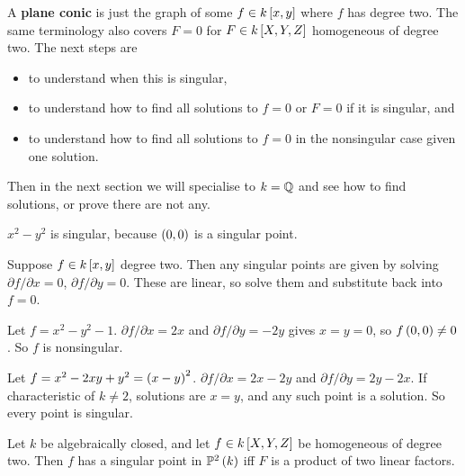 
A \textbf{plane conic} is just the graph of some $ f \in k\sbr{x, y} $ where $ f $ has degree two. The same terminology also covers $ F = 0 $ for $ F \in k\sbr{X, Y, Z} $ homogeneous of degree two. The next steps are
\begin{itemize}
\item to understand when this is singular,
\item to understand how to find all solutions to $ f = 0 $ or $ F = 0 $ if it is singular, and
\item to understand how to find all solutions to $ f = 0 $ in the nonsingular case given one solution.
\end{itemize}
Then in the next section we will specialise to $ k = \mathbb{Q} $ and see how to find solutions, or prove there are not any.

\begin{example*}
$ x^2 - y^2 $ is singular, because $ \br{0, 0} $ is a singular point.
\end{example*}

\begin{algorithm}[Checking if $ f = 0 $ is singular]
Suppose $ f \in k\sbr{x, y} $ degree two. Then any singular points are given by solving $ \partial f / \partial x = 0 $, $ \partial f / \partial y = 0 $. These are linear, so solve them and substitute back into $ f = 0 $.
\end{algorithm}

\begin{example*}
Let $ f = x^2 - y^2 - 1 $. $ \partial f / \partial x = 2x $ and $ \partial f / \partial y = -2y $ gives $ x = y = 0 $, so $ f\br{0, 0} \ne 0 $. So $ f $ is nonsingular.
\end{example*}

\begin{example*}
Let $ f = x^2 - 2xy + y^2 = \br{x - y}^2 $. $ \partial f / \partial x = 2x - 2y $ and $ \partial f / \partial y = 2y - 2x $. If characteristic of $ k \ne 2 $, solutions are $ x = y $, and any such point is a solution. So every point is singular.
\end{example*}

\begin{theorem}
Let $ k $ be algebraically closed, and let $ f \in k\sbr{X, Y, Z} $ be homogeneous of degree two. Then $ f $ has a singular point in $ \P^2\br{k} $ iff $ F $ is a product of two linear factors.
\end{theorem}

